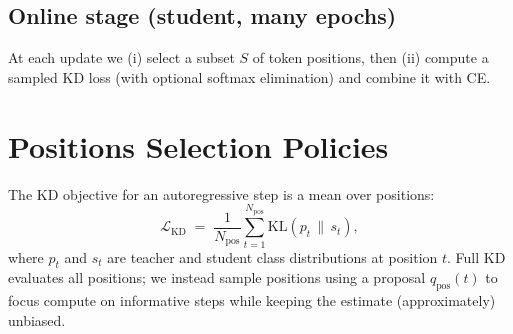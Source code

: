 \documentclass[11pt]{article}
\begin{document}
\subsection{Online stage (student, many epochs)}
At each update we (i) select a subset $S$ of token positions, then (ii) compute a sampled KD loss (with optional softmax elimination) and combine it with CE.

\section{Positions Selection Policies}
The KD objective for an autoregressive step is a mean over positions:
\[
	\mathcal{L}_{\text{KD}} \;=\; \frac{1}{N_{\text{pos}}} \sum_{t=1}^{N_{\text{pos}}}
	\mathrm{KL}\!\left(p_t \,\|\, s_t\right),
\]
where $p_t$ and $s_t$ are teacher and student class distributions at position $t$.
Full KD evaluates all positions; we instead sample positions using a proposal
$q_{\text{pos}}(t)$ to focus compute on informative steps while keeping the estimate (approximately) unbiased.
\end{document}

